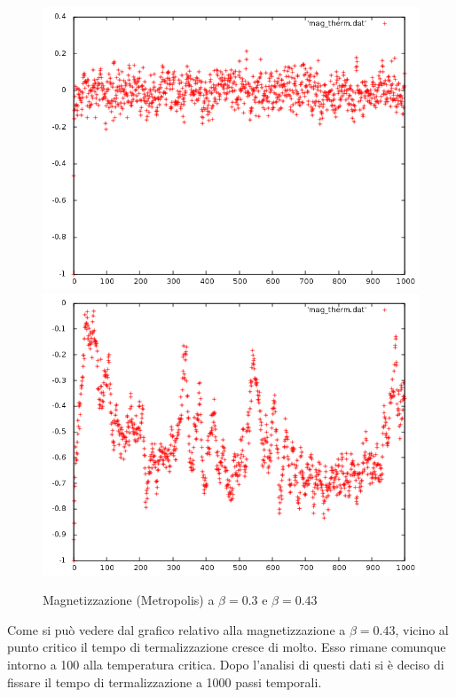 \begin{figure}[h]
\includegraphics[scale=0.35]{metropolis/mag_therm.png}
\includegraphics[scale=0.35]{metropolis/mag_therm_crit.png}
\caption{Magnetizzazione  (Metropolis) a $\beta=0.3$ e $\beta=0.43$}
\end{figure}
Come si può vedere dal grafico relativo alla magnetizzazione a $\beta=0.43$, vicino al punto critico il tempo di termalizzazione cresce di molto. Esso rimane comunque intorno a 100 alla temperatura critica.
Dopo l'analisi di questi dati si è deciso di fissare il tempo di termalizzazione a 1000 passi temporali.
